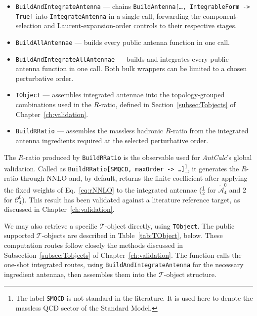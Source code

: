 \begin{itemize}
    \item \texttt{BuildAndIntegrateAntenna} --- chains \texttt{BuildAntenna[\ldots,
    IntegrableForm -> True]} into \texttt{IntegrateAntenna} in a single call, forwarding the
    component-selection and Laurent-expansion-order controls to their respective stages.
    \item \texttt{BuildAllAntennae} --- builds every public antenna function in one call.
    \item \texttt{BuildAndIntegrateAllAntennae} --- builds and integrates every public antenna
    function in one call. Both bulk wrappers can be limited to a chosen perturbative order.
    \item \texttt{TObject} --- assembles integrated antennae into the topology-grouped
    combinations used in the $R$-ratio, defined in Section~\ref{subsec:Tobjects} of
    Chapter~\ref{ch:validation}.
    \item \texttt{BuildRRatio} --- assembles the massless hadronic $R$-ratio from the
    integrated antenna ingredients required at the selected perturbative order.
\end{itemize}

The $R$-ratio produced by \texttt{BuildRRatio} is the observable used for \textit{AntCalc}'s
global validation. Called as
\texttt{BuildRRatio[SMQCD, maxOrder -> \ldots]}\footnote{The label \texttt{SMQCD} is not
standard in the literature. It is used here to denote the massless QCD sector of the Standard
Model.}, it generates the $R$-ratio through NNLO and, by default, returns the finite
coefficient after applying the fixed weights of Eq.~\eqref{eq:rNNLO} to the integrated antennae
($\tfrac12$ for $\tilde{\mathcal A}_4^0$ and $2$ for $\mathcal C_4^0$). This result has been validated against a
literature reference target, as discussed in Chapter~\ref{ch:validation}.

\iffalse
We may also retrieve a specific $\mathcal T$-object directly, using \texttt{TObject}. The public supported
$\mathcal T$-objects are described in Table~\ref{tab:TObject}, below. These computation routes follow closely the
methods discussed in Subsection~\ref{subsec:Tobjects} of Chapter~\ref{ch:validation}. The function calls the one-shot integrated routes, using \texttt{BuildAndIntegrateAntenna}
for the necessary ingredient antennae, then assembles them into the $\mathcal T$-object
structure.

